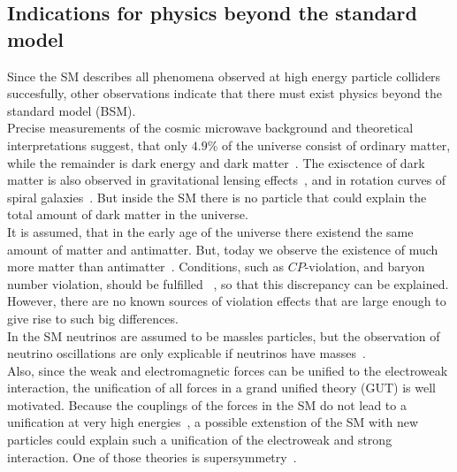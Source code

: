 \subsection{Indications for physics beyond the standard model}\label{sec:SM_bsm}
Since the SM describes all phenomena observed at high energy particle colliders succesfully, other observations indicate that there must exist physics beyond the standard model (BSM).\\
Precise measurements of the cosmic microwave background and theoretical interpretations suggest, that only $4.9\%$ of the universe consist of ordinary matter, while the remainder is dark energy and dark matter~\cite{DarkMatterPlanck}. The exisctence of dark matter is also observed in gravitational lensing effects~\cite{DarkMatterLensing}, and in rotation curves of spiral galaxies~\cite{DarkMatterRotation}. But inside the SM there is no particle that could explain the total amount of dark matter in the universe.\\
It is assumed, that in the early age of the universe there existend the same amount of matter and antimatter. But, today we observe the existence of much more matter than antimatter~\cite{Antimatter,AsymSM}. Conditions, such as $CP$-violation, and baryon number violation, should be fulfilled ~\cite{Sakharov}, so that this discrepancy can be explained. However, there are no known sources of violation effects that are large enough to give rise to such big differences.\\
In the SM neutrinos are assumed to be massles particles, but the observation of neutrino oscillations are only explicable if neutrinos have masses~\cite{NeutrinoMass,PDG}.\\
Also, since the weak and electromagnetic forces can be unified to the electroweak interaction, the unification of all forces in a grand unified theory (GUT) is well motivated. Because the couplings of the forces in the SM do not lead to a unification at very high energies~\cite{PDG}, a possible extenstion of the SM with new particles could explain such a unification of the electroweak and strong interaction. One of those theories is supersymmetry~\cite{SUSYOriginal}.


